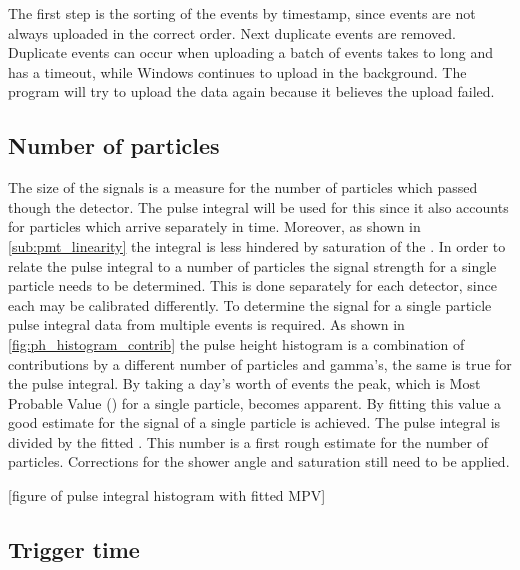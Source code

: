 The first step is the sorting of the events by timestamp, since events are not always uploaded in the correct order. Next duplicate events are removed. Duplicate events can occur when uploading a batch of events takes to long and \python has a timeout, while Windows continues to upload in the background. The \python program will try to upload the data again because it believes the upload failed.


\subsection{Number of particles}

The size of the signals is a measure for the number of particles which passed though the detector. The pulse integral will be used for this since it also accounts for particles which arrive separately in time. Moreover, as shown in \cref{sub:pmt_linearity} the integral is less hindered by saturation of the \adcs. In order to relate the pulse integral to a number of particles the signal strength for a single particle needs to be determined. This is done separately for each detector, since each may be calibrated differently. To determine the signal for a single particle pulse integral data from multiple events is required. As shown in \cref{fig:ph_histogram_contrib} the pulse height histogram is a combination of contributions by a different number of particles and gamma's, the same is true for the pulse integral. By taking a day's worth of events the peak, which is Most Probable Value (\mpv) for a single particle, becomes apparent. By fitting this value a good estimate for the signal of a single particle is achieved. The pulse integral is divided by the fitted \mpv. This number is a first rough estimate for the number of particles. Corrections for the shower angle and \pmt saturation still need to be applied.

[figure of pulse integral histogram with fitted MPV]


\subsection{Trigger time}
\label{sec:trigger_time}

